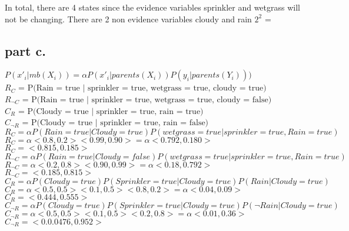   In total, there are 4 states since the evidence variables sprinkler and wetgrass will not be changing.
  There are 2 non evidence variables cloudy and rain $2^2$ = 

\subsection{part c.}

\noindent
$P(x'_i | mb(X_i)) = \alpha P(x'_i | parents(X_i)) P(y_i | parents(Y_i)))$ \\

\noindent
$R_C        $ = $\text{P(Rain   = true   | sprinkler = true, wetgrass = true, cloudy = true)}$ \\
$R_{\neg{C}}$ = $\text{P(Rain   = true   | sprinkler = true, wetgrass = true, cloudy = false)}$ \\
$C_R        $ = $\text{P(Cloudy = true   | sprinkler = true, rain = true)} $\\
$C_{\neg{R}}$ = $\text{P(Cloudy = true   | sprinkler = true, rain = false)} $ \\

\noindent
$R_C        = \alpha P(Rain = true| Cloudy = true) P(wetgrass = true | sprinkler = true, Rain = true)$ \\
$R_C        = \alpha <0.8, 0.2> <0.99,0.90> = \alpha <0.792, 0.180> $\\
$R_C        =  <0.815, 0.185> $\\

\noindent
$R_{\neg{C}}  = \alpha P(Rain = true| Cloudy = false) P(wetgrass = true | sprinkler = true, Rain = true) $\\
$R_{\neg{C}}  = \alpha <0.2, 0.8> <0.90, 0.99> = \alpha <0.18, 0.792> $\\
$R_{\neg{C}}  = <0.185,0.815> $\\

\noindent
$C_R        = \alpha P(Cloudy=true) P(Sprinkler=true | Cloudy=true) P(Rain | Cloudy=true) $\\
$C_R        = \alpha <0.5, 0.5> <0.1,0.5> <0.8,0.2 > = \alpha <0.04, 0.09>  $\\
$C_R        = <0.444, 0.555> $\\

\noindent
$C_{\neg{R}}   = \alpha P(Cloudy=true) P(Sprinkler=true | Cloudy=true) P(\neg{Rain} | Cloudy=true) $\\
$C_{\neg{R}}   = \alpha <0.5, 0.5> <0.1,0.5 > <0.2,0.8 > = \alpha <0.01,0.36 >  $\\
$C_{\neg{R}}   = <0.0.0476,0.952>    $\\



